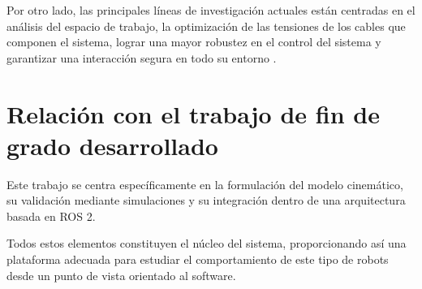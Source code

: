 Por otro lado, las principales líneas de investigación actuales están centradas en el análisis del espacio de trabajo, la optimización de las tensiones de los cables que componen el sistema, lograr una mayor robustez en el control del sistema y garantizar una interacción segura en todo su entorno \cite{gouttefarde2015tension,aref2008workspace,borgstrom2009tension}.

\section{Relación con el trabajo de fin de grado desarrollado}
\label{sec:segundaseccion}

Este trabajo se centra específicamente en la formulación del modelo cinemático, su validación mediante simulaciones y su integración dentro de una arquitectura basada en ROS 2.

\vspace{0.25cm}

Todos estos elementos constituyen el núcleo del sistema, proporcionando así una plataforma adecuada para estudiar el comportamiento de este tipo de robots desde un punto de vista orientado al software.

